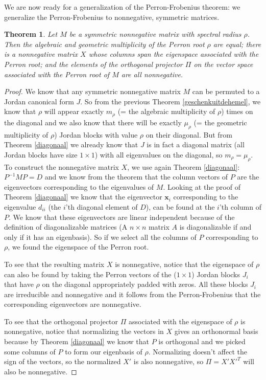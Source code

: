 \documentclass[a4paper,11pt]{report}
\newtheorem{theorem}{Theorem}[section]
\begin{document}
We are now ready for a generalization of the Perron-Frobenius theorem: we generalize the Perron-Frobenius to nonnegative, symmetric 
matrices.
\begin{theorem}\label{ultiemvoorspel}
  Let $M$ be a symmetric nonnegative matrix with spectral radius $\rho$. Then 
  the algebraic and geometric multiplicity of the Perron root $\rho$ are equal; 
  there is a nonnegative matrix $X$ whose columns span the eigenspace  associated with the Perron root; and the elements of the orthogonal projector 
  $\Pi$ on the vector space associated with the Perron root of $M$ are all 
  nonnegative.
\end{theorem}
\begin{proof}
  We know that any symmetric nonnegative matrix $M$ can be permuted to a Jordan canonical form 
  $J$. So from the previous Theorem \ref{geschenkuitdehemel},
  we know that $\rho$ will appear exactly $m_\rho$ (= the algebraic multiplicity of $\rho$) times on the diagonal 
  and we also know that there will be exactly $\mu_\rho$ (= the geometric multiplicity of $\rho$) Jordan blocks with value $\rho$ on their diagonal. But from
  Theorem \ref{diagonaal} we already know that $J$ is in fact a diagonal matrix (all Jordan blocks have size $1\times 1$) with all
  eigenvalues on the diagonal, so
  $m_\rho = \mu_\rho$.  To construct the nonnegative matrix $X$, we use again Theorem \ref{diagonaal}:
  $P^{-1}MP = D$ and we know from the theorem that the column vectors of $P$ are the eigenvectors 
  corresponding to the eigenvalues of $M$. Looking at the proof of Theorem \ref{diagonaal} we know 
  that the eigenvector $\mathbf{x}_i$ corresponding to the eigenvalue $d_{ii}$ (the $i$'th diagonal element of $D$), 
  can be found at the $i$'th column of $P$. We know that these eigenvectors are linear 
  independent because of the definition of diagonalizable matrices (A $n \times n$ matrix $A$ is diagonalizable if and only if it has an eigenbasis). 
  So if we select all the columns of $P$ corresponding to 
  $\rho$, we found the eigenspace of the Perron root. 
  
  To see that the resulting 
  matrix $X$ is nonnegative, notice that the eigenspace of $\rho$ can also be 
  found by taking the Perron vectors of the ($1 \times 1$) Jordan blocks $J_i$ that have $\rho$ on the diagonal appropriately padded 
  with zeros. All these blocks $J_i$ are irreducible and nonnegative and it 
  follows from the Perron-Frobenius that the corresponding eigenvectors are
  nonnegative. 
  
  To see that the orthogonal projector $\Pi$ associated with the eigenspace of $\rho$ 
  is nonnegative, notice that normalizing the vectors in $X$ gives an 
  orthonormal basis because by Theorem \ref{diagonaal} we know that $P$ is orthogonal and we 
  picked some columns of $P$ to form our eigenbasis of $\rho$. Normalizing doesn't affect the sign of the vectors, so the 
  normalized $X'$ is also nonnegative, so $\Pi = X'X'^T$ will also be nonnegative.
  \end{proof}
  
\end{document}
